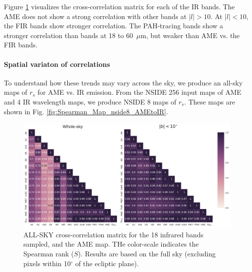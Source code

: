      Figure \ref{fig:AME_IR_crosscorr_allbandsg} visualizes the cross-correlation matrix for each of the IR bands. The AME does not show a strong correlation with other bands at $|l|>10$. At $|l|<10$, the FIR bands show stronger correlation. The PAH-tracing bands show a stronger correlation than bands at 18 to 60~$\mu$m, but weaker than AME vs. the FIR bands.

  \paragraph{Spatial variaton of correlations}
    To understand how these trends may vary across the sky, we produce an all-sky maps of $r_{s}$ for AME vs. IR emission. From the NSIDE 256 input maps of AME and 4 IR wavelength maps, we produce NSIDE 8 maps of $r_{s}$. These maps are shown in Fig. \hyperref[fig:Spearman_Map_nside8_AMEtoIR]{\ref*{fig:Spearman_Map_nside8_AMEtoIR}}.

      \begin{figure}
        \label{fig:AME_IR_crosscorr_allbandsg}
        \includegraphics[width=185mm]{../Plots/all_bands_corr_matrix_wAME_spearman.pdf}
        \centering
        \caption{ALL-SKY cross-correlation matrix for the 18 infrared bands sampled, and the AME map. THe color-scale indicates the Spearman rank ($S$). Results are based on the full sky (excluding pixels within 10$^{\circ}$ of the ecliptic plane).}
      \end{figure}

